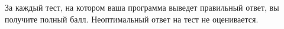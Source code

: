 За каждый тест, на котором ваша программа выведет правильный ответ, вы получите
полный балл. Неоптимальный ответ на тест не оценивается.
